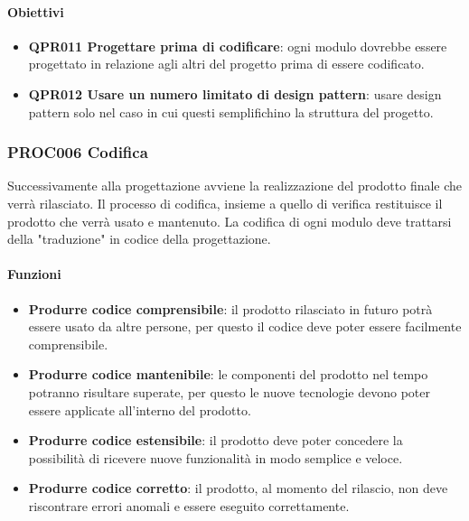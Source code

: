         \paragraph*{Obiettivi}
        \begin{itemize}
            \item \textbf{QPR011 Progettare prima di codificare}: ogni modulo dovrebbe essere progettato in relazione agli altri del progetto prima di essere codificato.
            \item \textbf{QPR012 Usare un numero limitato di design pattern}: usare design pattern solo nel caso in cui questi semplifichino la struttura del progetto.
        \end{itemize}
         
    \subsubsection{PROC006 Codifica}\label{proc006}
    Successivamente alla progettazione avviene la realizzazione del prodotto finale che verrà rilasciato. Il processo di codifica, insieme a quello di verifica restituisce il prodotto che verrà usato e mantenuto. La codifica di ogni modulo deve trattarsi della "traduzione" in codice della progettazione.
        
        \paragraph*{Funzioni}
        \begin{itemize}
            \item \textbf{Produrre codice comprensibile}: il prodotto rilasciato in futuro potrà essere usato da altre persone, per questo il codice deve poter essere facilmente comprensibile.
            \item \textbf{Produrre codice mantenibile}: le componenti del prodotto nel tempo potranno risultare superate, per questo le nuove tecnologie devono poter essere applicate all'interno del prodotto.
            \item \textbf{Produrre codice estensibile}: il prodotto deve poter concedere la possibilità di ricevere nuove funzionalità in modo semplice e veloce.
            \item \textbf{Produrre codice corretto}: il prodotto, al momento del rilascio, non deve riscontrare errori anomali e essere eseguito correttamente.
        \end{itemize}
        
